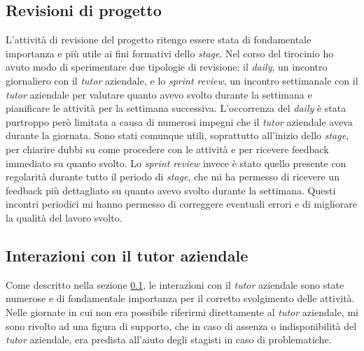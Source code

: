 \subsection{Revisioni di progetto} \label{sec:revisioni}
L'attività di revisione del progetto ritengo essere stata di fondamentale importanza e più utile ai fini formativi dello \textit{stage}.
Nel corso del tirocinio ho avuto modo di sperimentare due tipologie di revisione: il \textit{daily}, un incontro giornaliero con il \textit{tutor} aziendale, e lo \textit{sprint review}, un incontro settimanale con il \textit{tutor} aziendale per valutare quanto avevo svolto durante la settimana e pianificare le attività per la settimana successiva.
L'occorrenza del \textit{daily} è stata purtroppo però limitata a causa di numerosi impegni che il \textit{tutor} aziendale aveva durante la giornata. Sono stati comunque utili, soprattutto all'inizio dello \textit{stage}, per chiarire dubbi su come procedere con le attività e per ricevere feedback immediato su quanto svolto.
Lo \textit{sprint review} invece è stato quello presente con regolarità durante tutto il periodo di \textit{stage}, che mi ha permesso di ricevere un feedback più dettagliato su quanto avevo svolto durante la settimana. Questi incontri periodici mi hanno permesso di correggere eventuali errori e di migliorare la qualità del lavoro svolto.

\subsection{Interazioni con il tutor aziendale}
Come descritto nella sezione \ref{sec:revisioni}, le interazioni con il \textit{tutor} aziendale sono state numerose e di fondamentale importanza per il corretto svolgimento delle attività.
Nelle giornate in cui non era possibile riferirmi direttamente al \textit{tutor} aziendale, mi sono rivolto ad una figura di supporto, che in caso di assenza o indisponibilità del \textit{tutor} aziendale, era predista all'aiuto degli stagisti in caso di problematiche.



